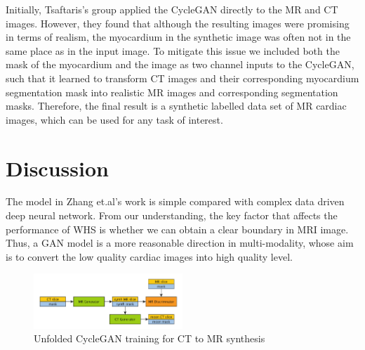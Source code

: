 \documentclass[10pt,sigconf,letterpaper,nonacm]{acmart}
\begin{document}
 Initially, Tsaftaris's group applied the CycleGAN directly to the MR and CT images. However, they found that although the resulting images were promising in terms of realism, the myocardium in the synthetic image was often not in the same place as in the input image. To mitigate this issue we included both the mask of the myocardium and the image as two channel inputs to the CycleGAN, such that it learned to transform CT images and their corresponding myocardium segmentation mask into realistic MR images and corresponding segmentation masks. Therefore, the final result is a synthetic labelled data set of MR cardiac images, which can be used for any task of interest.
 
 \section{Discussion}
 The model in Zhang et.al's work\cite{zhuang2016multi} is simple compared with complex data driven deep neural network. From our understanding, the key factor that affects the performance of WHS is whether we can obtain a clear boundary in MRI image. Thus, a GAN model is a more reasonable direction in multi-modality, whose aim is to convert the low quality cardiac images into high quality level. 

\begin{figure}
	\centering
	\includegraphics[width=0.5\textwidth]{images/Xiangyu_CycleGAN.png}
	\caption{Unfolded CycleGAN\cite{zhu2017unpaired} training for CT to MR synthesis}
	\label{Xiangyu_CycleGAN}
\end{figure} 

\setcounter{page}{1}


\end{document}
